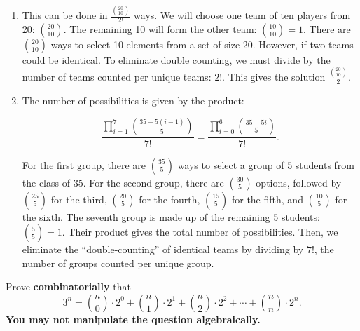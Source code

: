 \documentclass{article}
\theoremstyle{definition}
\begin{document}
\begin{solution}
\begin{enumerate}
\item This can be done in $\frac{\binom{20}{10}}{2!}$ ways. We will choose one team of ten players from 20: $\binom{20}{10}$. The remaining 10 will form the other team: $\binom{10}{10}=1$. There are $\binom{20}{10}$ ways to select 10 elements from a set of size 20. However, if two teams could be identical. To eliminate double counting, we must divide by the number of teams counted per unique teams: $2!$. This gives the solution $\frac{\binom{20}{10}}{2}$.
\item The number of possibilities is given by the product:

\[\frac{\prod_{i=1}^{7}{\binom{35-5(i-1)}{5}}}{7!}=\frac{\prod_{i=0}^{6}{\binom{35-5i}{5}}}{7!}.\]

For the first group, there are $\binom{35}{5}$ ways to select a group of 5 students from the class of 35. For the second group, there are $\binom{30}{5}$ options, followed by $\binom{25}{5}$ for the third, $\binom{20}{5}$ for the fourth, $\binom{15}{5}$ for the fifth, and $\binom{10}{5}$ for the sixth. The seventh group is made up of the remaining 5 students: $\binom{5}{5}=1$. Their product gives the total number of possibilities. Then, we eliminate the ``double-counting'' of identical teams by dividing by $7!$, the number of groups counted per unique group.
\end{enumerate}
\end{solution}
\begin{question}
    Prove \textbf{combinatorially} that
    \[ 3^n = \binom{n}{0} \cdot 2^0 + \binom{n}{1}\cdot 2^1+ \binom{n}{2}\cdot 2^2+\cdots +\binom{n}{n}\cdot 2^n. \]
    \textbf{You may not manipulate the question algebraically.}
\end{question}
\end{document}
